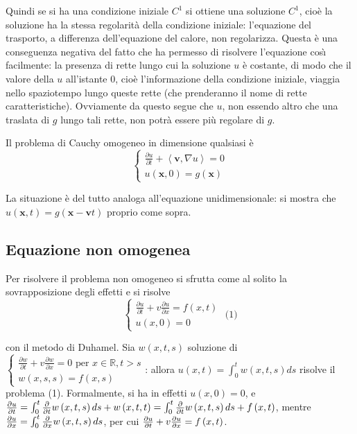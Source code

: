 \documentclass{article}
\begin{document}
Quindi se si ha una condizione iniziale $C^{1}$ si ottiene una soluzione $%
C^{1}$, cio\`{e} la soluzione ha la stessa regolarit\`{a} della condizione
iniziale: l'equazione del trasporto, a differenza dell'equazione del calore,
non regolarizza. Questa \`{e} una conseguenza negativa del fatto che ha
permesso di risolvere l'equazione cos\`{\i} facilmente: la presenza di rette
lungo cui la soluzione $u$ \`{e} costante, di modo che il valore della $u$
all'istante $0$, cio\`{e} l'informazione della condizione iniziale, viaggia
nello spaziotempo lungo queste rette (che prenderanno il nome di rette
caratteristiche). Ovviamente da questo segue che $u$, non essendo altro che
una traslata di $g$ lungo tali rette, non potr\`{a} essere pi\`{u} regolare
di $g$.

Il problema di Cauchy omogeneo in dimensione qualsiasi \`{e} 
\begin{equation*}
\left\{ 
\begin{array}{c}
\frac{\partial u}{\partial t}+\left\langle \mathbf{v},\nabla u\right\rangle
=0 \\ 
u\left( \mathbf{x},0\right) =g\left( \mathbf{x}\right)%
\end{array}%
\right.
\end{equation*}

La situazione \`{e} del tutto analoga all'equazione unidimensionale: si
mostra che $u\left( \mathbf{x},t\right) =g\left( \mathbf{x-v}t\right) $
proprio come sopra.

\subsection{Equazione non omogenea}

Per risolvere il problema non omogeneo si sfrutta come al solito la
sovrapposizione degli effetti e si risolve%
\begin{equation*}
\left\{ 
\begin{array}{c}
\frac{\partial u}{\partial t}+v\frac{\partial u}{\partial x}=f\left(
x,t\right) \\ 
u\left( x,0\right) =0%
\end{array}%
\right. \text{ (1)}
\end{equation*}

con il metodo di Duhamel. Sia $w\left( x,t,s\right) $ soluzione di $\left\{ 
\begin{array}{c}
\frac{\partial w}{\partial t}+v\frac{\partial w}{\partial x}=0\text{ per }%
x\in 
\mathbb{R}
,t>s \\ 
w\left( x,s,s\right) =f\left( x,s\right)%
\end{array}%
\right. $: allora $u\left( x,t\right) =\int_{0}^{t}w\left( x,t,s\right) ds$
risolve il problema (1). Formalmente, si ha in effetti $u\left( x,0\right)
=0 $, e $\frac{\partial u}{\partial t}=\int_{0}^{t}\frac{\partial }{\partial
t}w\left( x,t,s\right) ds+w\left( x,t,t\right) =\int_{0}^{t}\frac{\partial }{%
\partial t}w\left( x,t,s\right) ds+f\left( x,t\right) $, mentre $\frac{%
\partial u}{\partial x}=\int_{0}^{t}\frac{\partial }{\partial x}w\left(
x,t,s\right) ds$, per cui $\frac{\partial u}{\partial t}+v\frac{\partial u}{%
\partial x}=f\left( x,t\right) $.
\end{document}
